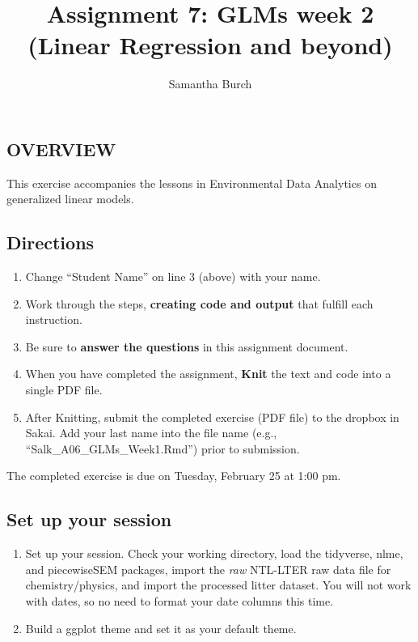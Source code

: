 \documentclass[]{article}
\title{Assignment 7: GLMs week 2 (Linear Regression and beyond)}
\author{Samantha Burch}
\date{}
\providecommand{\tightlist}{%
  \setlength{\itemsep}{0pt}\setlength{\parskip}{0pt}}
\begin{document}
\maketitle

\hypertarget{overview}{%
\subsection{OVERVIEW}\label{overview}}

This exercise accompanies the lessons in Environmental Data Analytics on
generalized linear models.

\hypertarget{directions}{%
\subsection{Directions}\label{directions}}

\begin{enumerate}
\def\labelenumi{\arabic{enumi}.}
\tightlist
\item
  Change ``Student Name'' on line 3 (above) with your name.
\item
  Work through the steps, \textbf{creating code and output} that fulfill
  each instruction.
\item
  Be sure to \textbf{answer the questions} in this assignment document.
\item
  When you have completed the assignment, \textbf{Knit} the text and
  code into a single PDF file.
\item
  After Knitting, submit the completed exercise (PDF file) to the
  dropbox in Sakai. Add your last name into the file name (e.g.,
  ``Salk\_A06\_GLMs\_Week1.Rmd'') prior to submission.
\end{enumerate}

The completed exercise is due on Tuesday, February 25 at 1:00 pm.

\hypertarget{set-up-your-session}{%
\subsection{Set up your session}\label{set-up-your-session}}

\begin{enumerate}
\def\labelenumi{\arabic{enumi}.}
\item
  Set up your session. Check your working directory, load the tidyverse,
  nlme, and piecewiseSEM packages, import the \emph{raw} NTL-LTER raw
  data file for chemistry/physics, and import the processed litter
  dataset. You will not work with dates, so no need to format your date
  columns this time.
\item
  Build a ggplot theme and set it as your default theme.
\end{enumerate}
\end{document}
